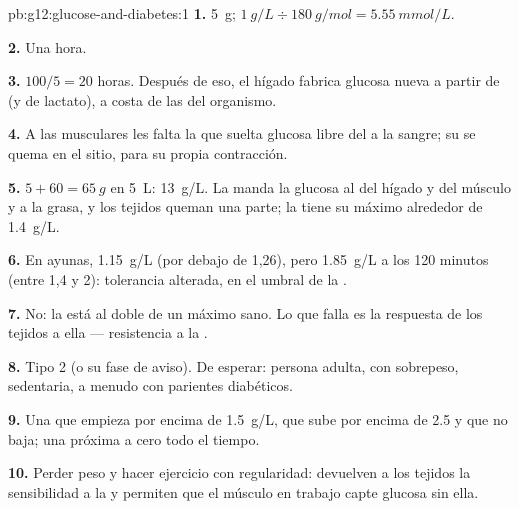 \begin{solution}{pb:g12:glucose-and-diabetes:1}
\textbf{1.} \qty{5}{g}; $\qty{1}{g/L} \div \qty{180}{g/mol} = \qty{5.55}{mmol/L}$.

\textbf{2.} Una hora.

\textbf{3.} $100/5 = 20$ horas. Después de eso, el hígado fabrica
glucosa nueva a partir de  (y de lactato), a costa de las
 del organismo.

\textbf{4.} A las  musculares les falta la  que suelta
glucosa libre del  a la sangre; su  se quema en el
sitio, para su propia contracción.

\textbf{5.} $5 + 60 = \qty{65}{g}$ en \qty{5}{L}: \qty{13}{g/L}. La
 manda la glucosa al  del hígado y del músculo y a la
grasa, y los tejidos queman una parte; la  tiene su máximo
alrededor de \qty{1.4}{g/L}.

\textbf{6.} En ayunas, \qty{1.15}{g/L} (por debajo de 1,26), pero
\qty{1.85}{g/L} a los 120 minutos (entre 1,4 y 2): tolerancia alterada,
en el umbral de la .

\textbf{7.} No: la  está al doble de un máximo sano. Lo que
falla es la respuesta de los tejidos a ella --- resistencia a la
.

\textbf{8.} Tipo 2 (o su fase de aviso). De esperar: persona adulta,
con sobrepeso, sedentaria, a menudo con parientes diabéticos.

\textbf{9.} Una  que empieza por encima de \qty{1.5}{g/L}, que
sube por encima de \num{2.5} y que no baja; una  próxima a cero
todo el tiempo.

\textbf{10.} Perder peso y hacer ejercicio con regularidad: devuelven a
los tejidos la sensibilidad a la  y permiten que el músculo en
trabajo capte glucosa sin ella.


\end{solution}
